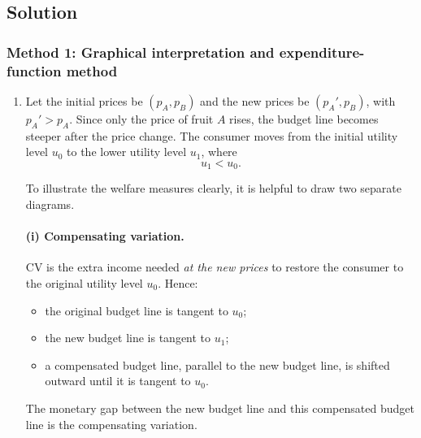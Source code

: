 \documentclass[12pt]{article}
\begin{document}
\newpage
\subsection{Solution}

\subsubsection{Method 1: Graphical interpretation and expenditure-function method}
\begin{enumerate}[label=(\alph*)]
    \item
Let the initial prices be \((p_A,p_B)\) and the new prices be \((p_A',p_B)\), with \(p_A'>p_A\). Since only the price of fruit \(A\) rises, the budget line becomes steeper after the price change. The consumer moves from the initial utility level \(u_0\) to the lower utility level \(u_1\), where
\[
u_1<u_0.
\]

To illustrate the welfare measures clearly, it is helpful to draw two separate diagrams.

\paragraph{(i) Compensating variation.}
CV is the extra income needed \emph{at the new prices} to restore the consumer to the original utility level \(u_0\). Hence:
\begin{itemize}[leftmargin=*]
    \item the original budget line is tangent to \(u_0\);
    \item the new budget line is tangent to \(u_1\);
    \item a compensated budget line, parallel to the new budget line, is shifted outward until it is tangent to \(u_0\).
\end{itemize}
The monetary gap between the new budget line and this compensated budget line is the compensating variation.

\begin{center}
\end{center}
\end{enumerate}
\end{document}
